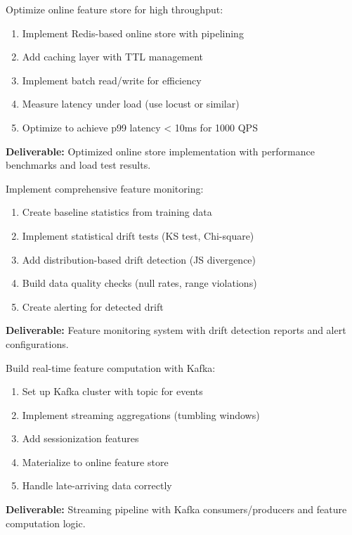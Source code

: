 \begin{exercise}
Optimize online feature store for high throughput:
\begin{enumerate}
    \item Implement Redis-based online store with pipelining
    \item Add caching layer with TTL management
    \item Implement batch read/write for efficiency
    \item Measure latency under load (use locust or similar)
    \item Optimize to achieve p99 latency < 10ms for 1000 QPS
\end{enumerate}
\textbf{Deliverable:} Optimized online store implementation with performance benchmarks and load test results.
\end{exercise}

\begin{exercise}
Implement comprehensive feature monitoring:
\begin{enumerate}
    \item Create baseline statistics from training data
    \item Implement statistical drift tests (KS test, Chi-square)
    \item Add distribution-based drift detection (JS divergence)
    \item Build data quality checks (null rates, range violations)
    \item Create alerting for detected drift
\end{enumerate}
\textbf{Deliverable:} Feature monitoring system with drift detection reports and alert configurations.
\end{exercise}

\begin{exercise}
Build real-time feature computation with Kafka:
\begin{enumerate}
    \item Set up Kafka cluster with topic for events
    \item Implement streaming aggregations (tumbling windows)
    \item Add sessionization features
    \item Materialize to online feature store
    \item Handle late-arriving data correctly
\end{enumerate}
\textbf{Deliverable:} Streaming pipeline with Kafka consumers/producers and feature computation logic.
\end{exercise}

